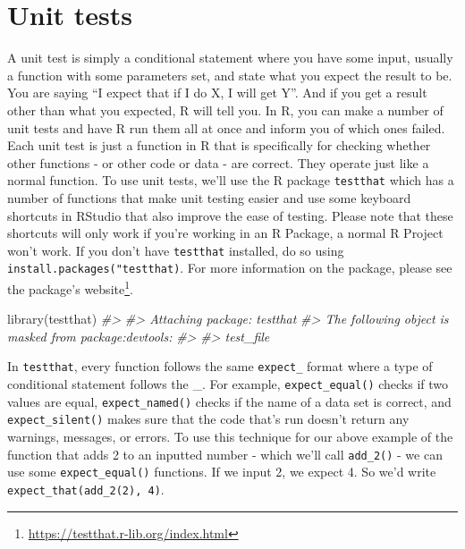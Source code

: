 \documentclass[
]{krantz}
\makeatletter
\newenvironment{Shaded}{\begin{snugshade}}{\end{snugshade}}
\newcommand{\CommentTok}[1]{\textcolor[rgb]{0.37,0.37,0.37}{\textit{#1}}}
\newcommand{\FunctionTok}[1]{\textcolor[rgb]{0,0,0}{#1}}
\newcommand{\NormalTok}[1]{#1}
\renewcommand{\href}[2]{#2\footnote{\url{#1}}}
\newenvironment{kframe}{%
\medskip{}
\setlength{\fboxsep}{.8em}
 \def\at@end@of@kframe{}%
 \ifinner\ifhmode%
  \def\at@end@of@kframe{\end{minipage}}%
  \begin{minipage}{\columnwidth}%
 \fi\fi%
 \def\FrameCommand##1{\hskip\@totalleftmargin \hskip-\fboxsep
 \colorbox{shadecolor}{##1}\hskip-\fboxsep
     \hskip-\linewidth \hskip-\@totalleftmargin \hskip\columnwidth}%
 \MakeFramed {\advance\hsize-\width
   \@totalleftmargin\z@ \linewidth\hsize
   \@setminipage}}%
 {\par\unskip\endMakeFramed%
 \at@end@of@kframe}
\renewenvironment{Shaded}{\begin{kframe}}{\end{kframe}}
\makeatother
\begin{document}
\hypertarget{unit-tests}{%
\section{Unit tests}\label{unit-tests}}

A unit test is simply a conditional statement where you have some input, usually a function with some parameters set, and state what you expect the result to be. You are saying ``I expect that if I do X, I will get Y''. And if you get a result other than what you expected, R will tell you. In R, you can make a number of unit tests and have R run them all at once and inform you of which ones failed. Each unit test is just a function in R that is specifically for checking whether other functions - or other code or data - are correct. They operate just like a normal function. To use unit tests, we'll use the R package \texttt{testthat} which has a number of functions that make unit testing easier and use some keyboard shortcuts in RStudio that also improve the ease of testing. Please note that these shortcuts will only work if you're working in an R Package, a normal R Project won't work. If you don't have \texttt{testthat} installed, do so using \texttt{install.packages("testthat)}. For more information on the package, please see the package's \href{https://testthat.r-lib.org/index.html}{website}.

\begin{Shaded}
\begin{Highlighting}[]
\FunctionTok{library}\NormalTok{(testthat)}
\CommentTok{\#\textgreater{} }
\CommentTok{\#\textgreater{} Attaching package: \textquotesingle{}testthat\textquotesingle{}}
\CommentTok{\#\textgreater{} The following object is masked from \textquotesingle{}package:devtools\textquotesingle{}:}
\CommentTok{\#\textgreater{} }
\CommentTok{\#\textgreater{}     test\_file}
\end{Highlighting}
\end{Shaded}

In \texttt{testthat}, every function follows the same \texttt{expect\_} format where a type of conditional statement follows the \_. For example, \texttt{expect\_equal()} checks if two values are equal, \texttt{expect\_named()} checks if the name of a data set is correct, and \texttt{expect\_silent()} makes sure that the code that's run doesn't return any warnings, messages, or errors. To use this technique for our above example of the function that adds 2 to an inputted number - which we'll call \texttt{add\_2()} - we can use some \texttt{expect\_equal()} functions. If we input 2, we expect 4. So we'd write \texttt{expect\_that(add\_2(2),\ 4)}.
\end{document}
